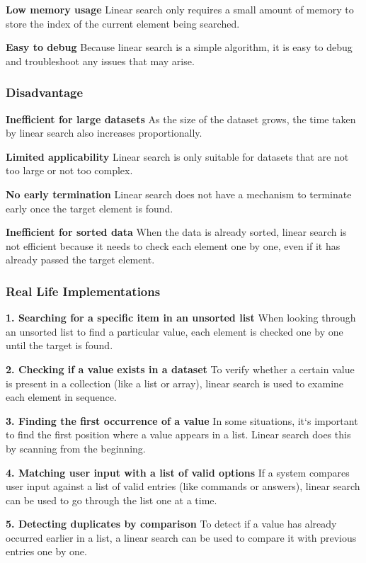 \textbf{Low memory usage} 
Linear search only requires a small amount of memory to store the index of the current element being searched. 

\textbf{Easy to debug} 
Because linear search is a simple algorithm, it is easy to debug and troubleshoot any issues that may arise. 

\subsubsection{Disadvantage}
\textbf{Inefficient for large datasets} 
As the size of the dataset grows, the time taken by linear search also increases proportionally. 

\textbf{Limited applicability} 
Linear search is only suitable for datasets that are not too large or not too complex. 

\textbf{No early termination} 
Linear search does not have a mechanism to terminate early once the target element is found. 

\textbf{Inefficient for sorted data} 
When the data is already sorted, linear search is not efficient because it needs to check each element one by one, even if it has already passed the target element. 

\subsubsection{Real Life Implementations}

\textbf{1. Searching for a specific item in an unsorted list }
   When looking through an unsorted list to find a particular value, each element is checked one by one until the target is found. 

\textbf{2. Checking if a value exists in a dataset }
   To verify whether a certain value is present in a collection (like a list or array), linear search is used to examine each element in sequence. 

\textbf{3. Finding the first occurrence of a value }
   In some situations, it`s important to find the first position where a value appears in a list. Linear search does this by scanning from the beginning. 

\textbf{4. Matching user input with a list of valid options }
   If a system compares user input against a list of valid entries (like commands or answers), linear search can be used to go through the list one at a time. 

\textbf{5. Detecting duplicates by comparison }
   To detect if a value has already occurred earlier in a list, a linear search can be used to compare it with previous entries one by one. 

